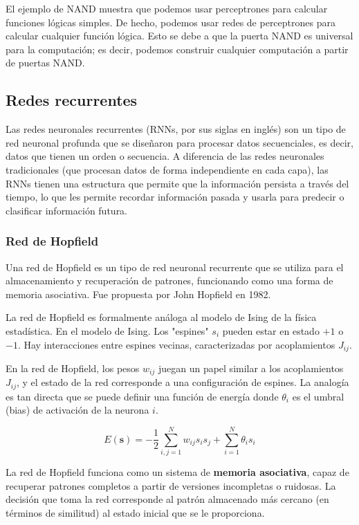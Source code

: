 El ejemplo de NAND muestra que podemos usar perceptrones para calcular funciones lógicas simples. De hecho, podemos usar redes de perceptrones para calcular cualquier función lógica. Esto se debe a que la puerta NAND es universal para la computación; es decir, podemos construir cualquier computación a partir de puertas NAND.

\subsection{Redes recurrentes}

Las redes neuronales recurrentes (RNNs, por sus siglas en inglés) son un tipo de red neuronal profunda que se diseñaron para procesar datos secuenciales, es decir, datos que tienen un orden o secuencia. A diferencia de las redes neuronales tradicionales (que procesan datos de forma independiente en cada capa), las RNNs tienen una estructura que permite que la información persista a través del tiempo, lo que les permite recordar información pasada y usarla para predecir o clasificar información futura.

\subsubsection{Red de Hopfield}

Una red de Hopfield es un tipo de red neuronal recurrente que se utiliza para el almacenamiento y recuperación de patrones, funcionando como una forma de memoria asociativa. Fue propuesta por John Hopfield en 1982.

La red de Hopfield es formalmente análoga al modelo de Ising de la física estadística. En el modelo de Ising. Los "espines" $s_i$ pueden estar en estado $+1$ o $-1$. Hay interacciones entre espines vecinas, caracterizadas por acoplamientos $J_{ij}$.

En la red de Hopfield, los pesos $w_{ij}$ juegan un papel similar a los acoplamientos $J_{ij}$, y el estado de la red corresponde a una configuración de espines. La analogía es tan directa que se puede definir una función de energía donde $\theta_i$ es el umbral (bias) de activación de la neurona $i$.

\begin{equation}
E(\mathbf{s}) = -\frac{1}{2} \sum_{i,j=1}^{N} w_{ij} s_i s_j + \sum_{i=1}^{N} \theta_i s_i
\end{equation}

La red de Hopfield funciona como un sistema de \textbf{memoria asociativa}, capaz de recuperar patrones completos a partir de versiones incompletas o ruidosas. La decisión que toma la red corresponde al patrón almacenado más cercano (en términos de similitud) al estado inicial que se le proporciona.

